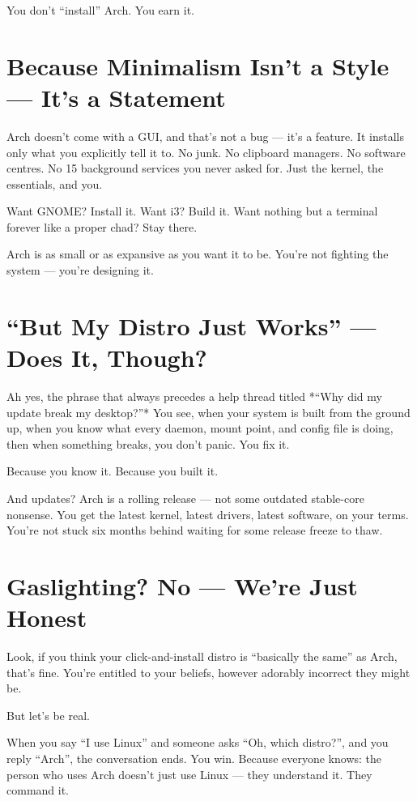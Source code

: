 \documentclass[12pt]{book}
\begin{document}
You don’t “install” Arch. You earn it.

\section*{Because Minimalism Isn't a Style — It's a Statement}

Arch doesn't come with a GUI, and that’s not a bug — it’s a feature. It installs only what you explicitly tell it to. No junk. No clipboard managers. No software centres. No 15 background services you never asked for. Just the kernel, the essentials, and you.

Want GNOME? Install it. Want i3? Build it. Want nothing but a terminal forever like a proper chad? Stay there.

Arch is as small or as expansive as you want it to be. You’re not fighting the system — you’re designing it.

\section*{“But My Distro Just Works” — Does It, Though?}

Ah yes, the phrase that always precedes a help thread titled *“Why did my update break my desktop?”* You see, when your system is built from the ground up, when you know what every daemon, mount point, and config file is doing, then when something breaks, you don’t panic. You fix it.

Because you know it. Because you built it.

And updates? Arch is a rolling release — not some outdated stable-core nonsense. You get the latest kernel, latest drivers, latest software, on your terms. You're not stuck six months behind waiting for some release freeze to thaw.

\section*{Gaslighting? No — We’re Just Honest}

Look, if you think your click-and-install distro is “basically the same” as Arch, that’s fine. You’re entitled to your beliefs, however adorably incorrect they might be.

But let’s be real.

When you say “I use Linux” and someone asks “Oh, which distro?”, and you reply “Arch”, the conversation ends. You win. Because everyone knows: the person who uses Arch doesn’t just use Linux — they understand it. They command it.
\end{document}
